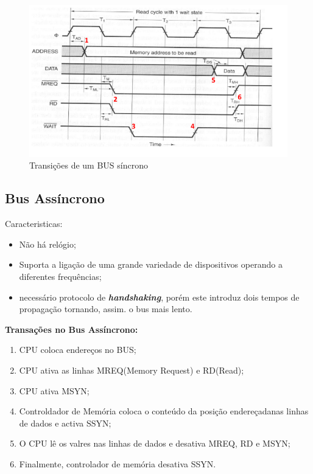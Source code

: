 \documentclass[10pt,a4paper]{paper}
\begin{document}
	\begin{figure}[ht]
		\includegraphics[scale=0.7]{fig3.png}
		\centering
		\caption{Transições de um BUS síncrono}
		\label{fig:figura2 }
	\end{figure}



\subsection*{Bus Assíncrono}

Caracteristicas:
\begin{itemize}
	\item Não há relógio;
	\item Suporta a ligação de uma grande variedade de dispositivos operando a diferentes frequências;
	\item necessário protocolo de \textit{\textbf{handshaking}}, porém este introduz dois tempos de propagação tornando, assim. o bus  mais lento.
\end{itemize}

\begin{flushleft}
	\textbf{Transações no Bus Assíncrono:}
\end{flushleft}

\begin{enumerate}
	\item CPU coloca endereços no BUS;
	\item CPU ativa as linhas MREQ(Memory Request) e RD(Read);
	\item CPU ativa MSYN;
	\item Controldador de Memória coloca o conteúdo da posição endereçadanas linhas de dados e activa SSYN;
	\item O CPU lê os valres nas linhas de dados e desativa MREQ, RD e MSYN;
	\item Finalmente, controlador de memória desativa SSYN.
\end{enumerate}
\end{document}
